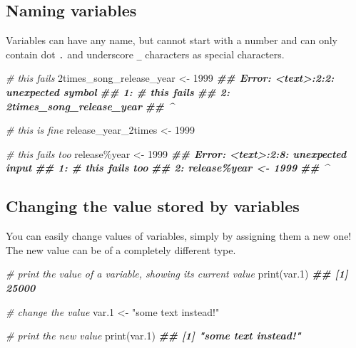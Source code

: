 \documentclass[
]{book}
\newenvironment{Shaded}{\begin{snugshade}}{\end{snugshade}}
\newcommand{\CommentTok}[1]{\textcolor[rgb]{0.56,0.35,0.01}{\textit{#1}}}
\newcommand{\DecValTok}[1]{\textcolor[rgb]{0.00,0.00,0.81}{#1}}
\newcommand{\DocumentationTok}[1]{\textcolor[rgb]{0.56,0.35,0.01}{\textbf{\textit{#1}}}}
\newcommand{\FloatTok}[1]{\textcolor[rgb]{0.00,0.00,0.81}{#1}}
\newcommand{\FunctionTok}[1]{\textcolor[rgb]{0.00,0.00,0.00}{#1}}
\newcommand{\NormalTok}[1]{#1}
\newcommand{\OtherTok}[1]{\textcolor[rgb]{0.56,0.35,0.01}{#1}}
\newcommand{\StringTok}[1]{\textcolor[rgb]{0.31,0.60,0.02}{#1}}
\begin{document}
\hypertarget{naming-variables}{%
\subsection{Naming variables}\label{naming-variables}}

Variables can have any name, but cannot start with a number and can only contain dot \texttt{.} and underscore \texttt{\_} characters as special characters.

\begin{Shaded}
\begin{Highlighting}[]
\CommentTok{\# this fails}
\NormalTok{2times\_song\_release\_year }\OtherTok{\textless{}{-}} \DecValTok{1999}
\DocumentationTok{\#\# Error: \textless{}text\textgreater{}:2:2: unexpected symbol}
\DocumentationTok{\#\# 1: \# this fails}
\DocumentationTok{\#\# 2: 2times\_song\_release\_year}
\DocumentationTok{\#\#     \^{}}
\end{Highlighting}
\end{Shaded}

\begin{Shaded}
\begin{Highlighting}[]
\CommentTok{\# this is fine}
\NormalTok{release\_year\_2times }\OtherTok{\textless{}{-}} \DecValTok{1999}
\end{Highlighting}
\end{Shaded}

\begin{Shaded}
\begin{Highlighting}[]
\CommentTok{\# this fails too}
\NormalTok{release\%year }\OtherTok{\textless{}{-}} \DecValTok{1999}
\DocumentationTok{\#\# Error: \textless{}text\textgreater{}:2:8: unexpected input}
\DocumentationTok{\#\# 1: \# this fails too}
\DocumentationTok{\#\# 2: release\%year \textless{}{-} 1999}
\DocumentationTok{\#\#           \^{}}
\end{Highlighting}
\end{Shaded}

\hypertarget{changing-the-value-stored-by-variables}{%
\subsection{Changing the value stored by variables}\label{changing-the-value-stored-by-variables}}

You can easily change values of variables, simply by assigning them a new one! The new value can be of a completely different type.

\begin{Shaded}
\begin{Highlighting}[]
\CommentTok{\# print the value of a variable, showing its current value}
\FunctionTok{print}\NormalTok{(var}\FloatTok{.1}\NormalTok{)}
\DocumentationTok{\#\# [1] 25000}

\CommentTok{\# change the value}
\NormalTok{var}\FloatTok{.1} \OtherTok{\textless{}{-}} \StringTok{"some text instead!"}

\CommentTok{\# print the new value}
\FunctionTok{print}\NormalTok{(var}\FloatTok{.1}\NormalTok{)}
\DocumentationTok{\#\# [1] "some text instead!"}
\end{Highlighting}
\end{Shaded}
\end{document}
